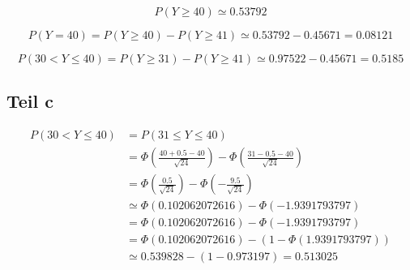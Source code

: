 \documentclass[10pt,a4paper]{article}
\begin{document}
\begin{equation}
  P(Y \ge 40) \simeq 0.53792
\end{equation}

\begin{equation}
  P(Y = 40) = P(Y \ge 40) - P(Y \ge 41) \simeq 0.53792 - 0.45671 = 0.08121
\end{equation}

\begin{equation}
  P(30 < Y \le 40) = P(Y \ge 31) - P(Y \ge 41) \simeq 0.97522 - 0.45671 = 0.5185
\end{equation}

\subsection{Teil c}

\begin{align*}
  P(30 < Y \le 40) & = P(31 \le Y \le 40)\\
  & = \Phi\left( \frac{40 + 0.5 - 40}{\sqrt{24}} \right) - \Phi\left( \frac{31 - 0.5 - 40}{\sqrt{24}} \right)\\
  & = \Phi\left( \frac{0.5}{\sqrt{24}} \right) - \Phi\left( -\frac{9.5}{\sqrt{24}} \right)\\
  & \simeq \Phi(0.102062072616) - \Phi(-1.9391793797)\\
  & = \Phi(0.102062072616) - \Phi(-1.9391793797)\\
  & = \Phi(0.102062072616) - (1 - \Phi(1.9391793797))\\
  & \simeq 0.539828 - (1 - 0.973197) = 0.513025
\end{align*}
\end{document}
